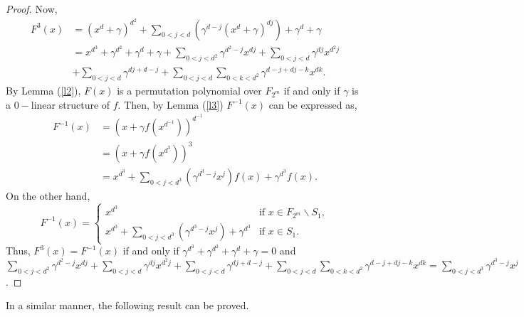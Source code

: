 \documentclass[12pt,a4paper]{article}
\begin{document}
\begin{proof}
	Now,
	\begin{equation}
		\begin{split}
			F^{3}(x)&=(x^{d}+\gamma)^{d^{2}}+\sum\limits_{0<j<d}(\gamma^{d-j}(x^{d}+\gamma)^{dj})+\gamma^{d}+\gamma\\
			&=x^{d^{3}}+\gamma^{d^{2}}+\gamma^{d}+\gamma+\sum\limits_{0<j<d^{2}}\gamma^{d^{2}-j}x^{dj}+\sum\limits_{0<j<d}\gamma^{dj}x^{d^{2}j}\\ &+\sum\limits_{0<j<d}\gamma^{dj+d-j}+\sum\limits_{0<j<d}\sum\limits_{0<k<d^{2}}\gamma^{d-j+dj-k}x^{dk}.
		\end{split}
	\end{equation}
	By Lemma (\ref{l2}), $ F(x) $ is a permutation polynomial over $ F_{2^{m}} $ if and only if $ \gamma $ is a $0-$linear structure of $ f $. Then, by Lemma (\ref{l3}) $ F^{-1}(x) $ can be expressed as, 
	\begin{equation}
		\begin{split}
			F^{-1}(x)&=(x+\gamma f(x^{d^{-1}}))^{d^{-1}}\\
			&=(x+\gamma f(x^{d^{3}}))^{3}\\
			&=x^{d^{3}}+\sum\limits_{0<j<d^{3}}(\gamma^{d^{3}-j}x^{j})f(x)+\gamma^{d^{3}}f(x).
		\end{split}
	\end{equation}
	On the other hand,
	\begin{equation}
		F^{-1}(x)=\begin{cases}
			x^{d^{3}} & \text{if } x\in F_{2^{m}}\backslash S_{1},\\
			x^{d^{3}}+\sum\limits_{0<j<d^{3}}(\gamma^{d^{3}-j}x^{j})+\gamma^{d^{3}} & \text{if } x\in S_{1}.
		\end{cases}
	\end{equation}
	Thus, $ F^{3}(x)=F^{-1}(x) $ if and only if $ \gamma^{d^{3}}+\gamma^{d^{2}}+\gamma^{d}+\gamma=0 $ and $ \sum\limits_{0<j<d^{2}}\gamma^{d^{2}-j}x^{dj}+\sum\limits_{0<j<d}\gamma^{dj}x^{d^{2}j} +\sum\limits_{0<j<d}\gamma^{dj+d-j}+\sum\limits_{0<j<d}\sum\limits_{0<k<d^{2}}\gamma^{d-j+dj-k}x^{dk}=
 \sum\limits_{0<j<d^{3}}\gamma^{d^{3}-j}x^{j}$.
\end{proof}
In a similar manner, the following result can be proved.
\end{document}
